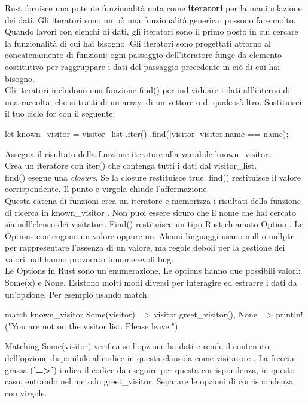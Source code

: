 \documentclass[11pt,a4paper]{article}
\begin{document}
Rust fornisce una potente funzionalità nota come \textbf{iteratori} per la manipolazione dei dati. Gli iteratori sono un pò una funzionalità generica: possono fare molto. Quando lavori con elenchi di dati, gli iteratori sono il primo posto in cui cercare la funzionalità di cui hai bisogno. Gli iteratori sono progettati attorno al concatenamento di funzioni: ogni passaggio dell'iteratore funge da elemento costitutivo per raggruppare i dati del passaggio precedente in ciò di cui hai bisogno.\\
Gli iteratori includono una funzione {\color{mauve}find()} per individuare i dati all'interno di una raccolta, che si tratti di un array, di un vettore o di qualcos'altro. Sostituisci il tuo ciclo for con il seguente:
 \begin{rust}
let known_visitor = visitor_list
	.iter()
	.find(|visitor| visitor.name == name);
\end{rust}
Assegna il risultato della funzione iteratore alla variabile known\_visitor.\\
Crea un iteratore con iter() che contenga tutti i dati dal visitor\_list.\\
find() esegue una \textit{closure}. Se la closure restituisce true, find() restituisce il valore corrispondente. Il punto e virgola chiude l'affermazione.\\
Questa catena di funzioni crea un iteratore e memorizza i risultati della funzione di ricerca in known\_visitor . Non puoi essere sicuro che il nome che hai cercato sia nell'elenco dei visitatori. Find() restituisce un tipo Rust chiamato {\color{RedTypename}Option} . Le Options contengono un valore oppure no. Alcuni linguaggi usano null o nullptr per rappresentare l'assenza di un valore, ma regole deboli per la gestione dei valori null hanno provocato innumerevoli bug.\\
Le Options in Rust sono un'enumerazione. Le options hanno due possibili valori: Some(x) e None. Esistono molti modi diversi per interagire ed estrarre i dati da un'opzione. Per esempio usando {\color{mauve}match}:
\begin{rust}
match known_visitor {
	Some(visitor) => visitor.greet_visitor(),
	None => println!("You are not on the visitor list. Please leave.")
}
\end{rust}
Matching Some(visitor) verifica se l'opzione ha dati e rende il contenuto dell'opzione disponibile al codice in questa clausola come visitatore . La freccia grassa (\textbf{'=>'}) indica il codice da eseguire per questa corrispondenza, in questo caso, entrando nel metodo greet\_visitor. Separare le opzioni di corrispondenza con virgole.\\
\end{document}
